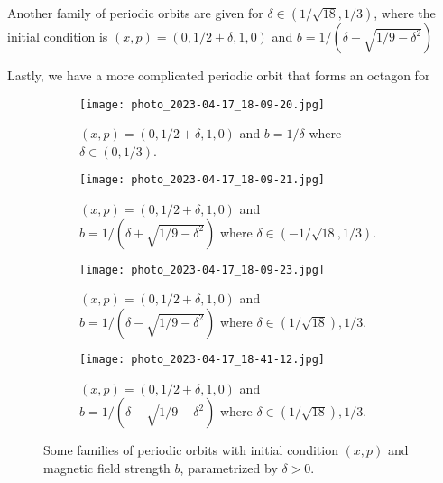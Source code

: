 Another family of periodic orbits are given for $\delta\in(1/\sqrt{18},1/3)$, where the initial condition is $(x,p)=(0,1/2+\delta,1,0)$ and $b = 1/(\delta-\sqrt{1/9-\delta^2})$

Lastly, we have a more complicated periodic orbit that forms an octagon for 


\begin{figure}[!th]
\centering
\begin{subfigure}{0.49\textwidth}
\centering
\texttt{[image: photo\_2023-04-17\_18-09-20.jpg]}
\caption{$(x,p) = (0,1/2+\delta,1,0)$ and $b=1/\delta$ where $\delta\in(0,1/3)$.}
\label{subfig:periodicorbit1}
\end{subfigure}
%
\begin{subfigure}{0.49\textwidth}
\texttt{[image: photo\_2023-04-17\_18-09-21.jpg]}
\caption{$(x,p) = (0,1/2+\delta,1,0)$ and $b=1/(\delta+\sqrt{1/9-\delta^2})$ where $\delta\in(-1/\sqrt{18},1/3)$.}
\label{subfig:periodicorbit2}
\end{subfigure}
%
\begin{subfigure}{0.49\textwidth}
\texttt{[image: photo\_2023-04-17\_18-09-23.jpg]}
\caption{$(x,p) = (0,1/2+\delta,1,0)$ and $b=1/(\delta-\sqrt{1/9-\delta^2})$ where $\delta\in(1/\sqrt{18}),1/3$.}
\label{subfig:periodicorbit3}
\end{subfigure}
%
\begin{subfigure}{0.49\textwidth}
\texttt{[image: photo\_2023-04-17\_18-41-12.jpg]}
\caption{$(x,p) = (0,1/2+\delta,1,0)$ and $b=1/(\delta-\sqrt{1/9-\delta^2})$ where $\delta\in(1/\sqrt{18}),1/3$.}
\label{subfig:periodicorbit4}
\end{subfigure}
\caption{Some families of periodic orbits with initial condition $(x,p)$ and magnetic field strength $b$, parametrized by $\delta>0$.}
\label{fig:periodicorbits}
\end{figure}

\color{black}